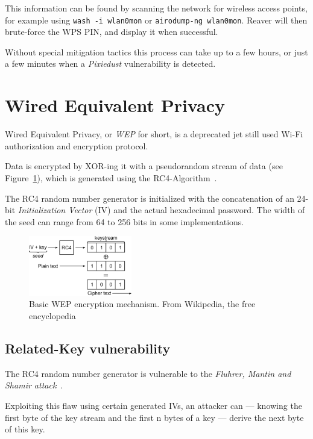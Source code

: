 This information can be found by scanning the network for wireless access points, for example using \lstinline{wash -i wlan0mon} or \lstinline{airodump-ng wlan0mon}. Reaver will then brute-force the WPS PIN, and display it when successful. 

Without special mitigation tactics this process can take up to a few hours, or just a few minutes when a \emph{Pixiedust} vulnerability is detected.

\section{Wired Equivalent Privacy}

Wired Equivalent Privacy, or \emph{WEP} for short, is a deprecated jet still used Wi-Fi authorization and encryption protocol.

Data is encrypted by XOR-ing it with a pseudorandom stream of data (see Figure~\ref{fig:wepmech}), which is generated using the RC4-Algorithm~\cite{WiFi16}.

The RC4 random number generator is initialized with the concatenation of an 24-bit \emph{Initialization Vector} (IV) and the actual hexadecimal password. The width of the seed can range from 64 to 256 bits in some implementations.

\begin{figure}
\includegraphics[width=0.4\textwidth]{src/img/Wep-crypt-alt.png}
\caption{Basic WEP encryption mechanism. From Wikipedia, the free encyclopedia~\cite{BHL07}}\label{fig:wepmech}
\end{figure}

\subsection{Related-Key vulnerability}

The RC4 random number generator is vulnerable to the \emph{Fluhrer, Mantin and Shamir attack}~\cite{FMS01}.

Exploiting this flaw using certain generated IVs, an attacker can --- knowing the first byte of the key stream and the first n bytes of a key --- derive the next byte of this key.

